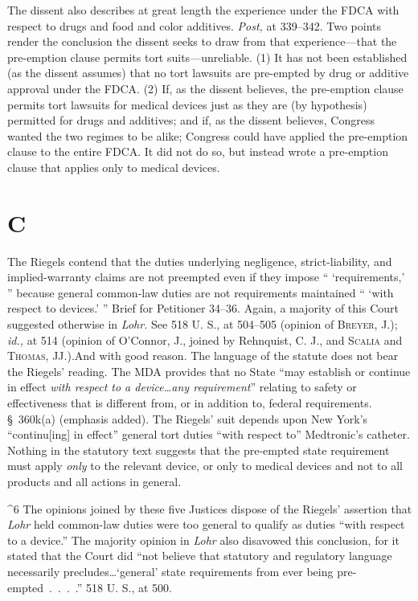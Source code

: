 {  The dissent also describes at great length the experience under the
FDCA with respect to drugs and food and color additives. \emph{Post,}
at 339--342. Two points render the conclusion the dissent seeks
to draw from that experience---that the pre-emption clause permits
tort suits---unreliable. (1) It has not been established (as the
dissent assumes) that no tort lawsuits are pre-empted by drug or
additive approval under the FDCA. (2) If, as the dissent believes, the
pre-emption clause permits tort lawsuits for medical devices just as
they are (by hypothesis) permitted for drugs and additives; and if,
as the dissent believes, Congress wanted the two regimes to be alike;
Congress could have applied the pre-emption clause to the entire FDCA.
It did not do so, but instead wrote a pre-emption clause that applies
only to medical devices.

\section{C}

  The Riegels contend that the duties underlying negligence,
strict-liability, and implied-warranty claims are not preempted even
if they impose `` ‘requirements,' '' because general common-law
duties are not requirements maintained `` ‘with respect to
devices.' '' Brief for Petitioner 34--36. Again, a majority
of this Court suggested otherwise in \emph{Lohr.} See 518 U. S., at
504--505 (opinion of \textsc{Breyer,} J.); \emph{id.,} at 514 (opinion
of O'Connor, J., joined by Rehnquist, C. J., and \textsc{Scalia} and
\textsc{Thomas,} JJ.).\footnotemark[6] And with good reason. The \newpage  language of
the statute does not bear the Riegels' reading. The MDA provides that
no State ``may establish or continue in effect \emph{with respect to a
device\dots any requirement}'' relating to safety or effectiveness
that is different from, or in addition to, federal requirements.
\S~360k(a) (emphasis added). The Riegels' suit depends upon New
York's ``continu[ing] in effect'' general tort duties ``with
respect to'' Medtronic's catheter. Nothing in the statutory text
suggests that the pre-empted state requirement must apply \emph{only} to
the relevant device, or only to medical devices and not to all products
and all actions in general.

^6 The opinions joined by these five Justices dispose of the Riegels'
assertion that \emph{Lohr} held common-law duties were too general to
qualify as duties ``with respect to a device.'' The majority opinion
in \emph{Lohr} also disavowed this conclusion, for it stated that the Court
did ``not believe that  statutory and regulatory
language necessarily precludes\dots ‘general' state requirements
from ever being pre-empted~.~.~.~.'' 518 U. S., at 500.

}
